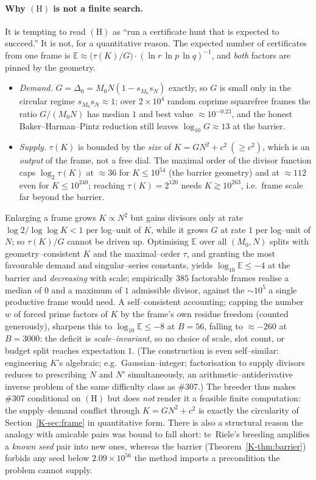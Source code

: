 \documentclass[11pt]{article}
\theoremstyle{definition}
\begin{document}
\paragraph{Why $(\mathrm{H})$ is not a finite search.} It is tempting to read $(\mathrm{H})$ as
``run a certificate hunt that is expected to succeed.'' It is not, for a quantitative reason. The
expected number of certificates from one frame is $\mathbb{E}\approx
\bigl(\tau(K)/G\bigr)\cdot(\ln r\,\ln p\,\ln q)^{-1}$, and \emph{both} factors are pinned by the
geometry.
\begin{itemize}[leftmargin=1.4em]
\item \emph{Demand.} $G=\Delta_0=M_0N(1-s_{M_0}s_N)$ exactly, so $G$ is small only in the circular
regime $s_{M_0}s_N\approx1$; over $2\times10^4$ random coprime squarefree frames the ratio
$G/(M_0N)$ has median $1$ and best value $\approx10^{-0.23}$, and the honest Baker--Harman--Pintz
reduction still leaves $\log_{10}G\approx13$ at the barrier.
\item \emph{Supply.} $\tau(K)$ is bounded by the \emph{size} of $K=GN^2+c^2\ (\ge c^2)$, which is an
\emph{output} of the frame, not a free dial. The maximal order of the divisor function
\cite[Thm.~317]{HardyWright} caps $\log_2\tau(K)$ at $\approx36$ for $K\le10^{54}$ (the barrier
geometry) and at $\approx112$ even for $K\le10^{240}$; reaching $\tau(K)=2^{120}$ needs
$K\gtrsim10^{263}$, i.e.\ frame scale far beyond the barrier.
\end{itemize}
Enlarging a frame grows $K\propto N^2$ but gains divisors only at rate $\log2/\log\log K<1$ per
log--unit of $K$, while it grows $G$ at rate $1$ per log--unit of $N$; so $\tau(K)/G$ cannot be
driven up. Optimising $\mathbb{E}$ over all $(M_0,N)$ splits with geometry--consistent $K$ and the
maximal--order $\tau$, and granting the most favourable demand and singular--series constants, yields
$\log_{10}\mathbb{E}\le-4$ at the barrier and \emph{decreasing} with scale; empirically $385$
factorable frames realise a median of $0$ and a maximum of $1$ admissible divisor, against the
$\sim10^{5}$ a single productive frame would need. A self--consistent accounting; capping the
number $w$ of forced prime factors of $K$ by the frame's own residue freedom (counted generously),
sharpens this to $\log_{10}\mathbb{E}\le-8$ at $B=56$, falling to $\approx-260$ at $B=3000$: the
deficit is \emph{scale--invariant}, so no choice of scale, slot count, or budget split reaches
expectation $1$. (The construction is even self--similar: engineering $K$'s algebraic; e.g.\
Gaussian--integer; factorisation to supply divisors reduces to prescribing $N$ and $N'$
simultaneously, an arithmetic--antiderivative inverse problem of the same difficulty class as \#307.)
The breeder thus makes \#307 conditional on $(\mathrm{H})$ but does \emph{not} render it a feasible
finite computation: the supply--demand conflict through $K=GN^2+c^2$ is exactly the circularity of
Section~\ref{K-sec:frame} in quantitative form. There is also a structural reason the analogy with
amicable pairs was bound to fall short: te~Riele's breeding amplifies a \emph{known seed} pair into
new ones, whereas the barrier (Theorem~\ref{K-thm:barrier}) forbids any seed below $2.09\times10^{56}$
the method imports a precondition the problem cannot supply.
\end{document}
